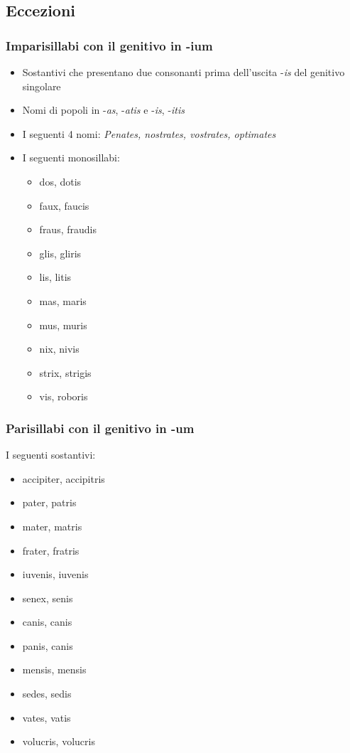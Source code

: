 \subsection{Eccezioni}
\subsubsection*{Imparisillabi con il genitivo in -ium}
\begin{itemize}
    \item Sostantivi che presentano due consonanti prima dell'uscita -\textit{is} del genitivo singolare
    \item Nomi di popoli in -\textit{as}, -\textit{atis} e -\textit{is}, -\textit{itis}
    \item I seguenti 4 nomi: \textit{Penates, nostrates, vostrates, optimates}
    \item I seguenti monosillabi:
    \begin{itemize}
        \item dos, dotis
        \item faux, faucis
        \item fraus, fraudis
        \item glis, gliris
        \item lis, litis
        \item mas, maris
        \item mus, muris
        \item nix, nivis
        \item strix, strigis
        \item vis, roboris
    \end{itemize}
\end{itemize}

\subsubsection*{Parisillabi con il genitivo in -um}
I seguenti sostantivi:
\begin{itemize}
    \item accipiter, accipitris
    \item pater, patris
    \item mater, matris
    \item frater, fratris
    \item iuvenis, iuvenis
    \item senex, senis
    \item canis, canis
    \item panis, canis
    \item mensis, mensis
    \item sedes, sedis
    \item vates, vatis
    \item volucris, volucris
\end{itemize}

